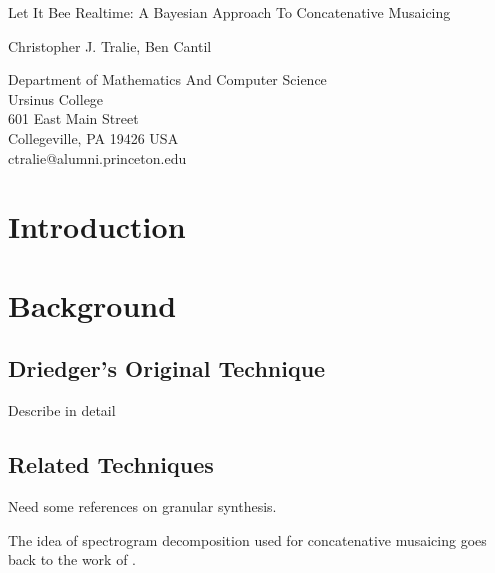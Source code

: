 \documentclass[letterpaper, 12pt]{article}
\begin{document}
{\cmjTitle Let It Bee Realtime: A Bayesian Approach To Concatenative Musaicing}
\vspace*{24pt}


{\cmjAuthor Christopher J. Tralie, Ben Cantil}	%
 
\begin{cmjAuthorAddress}
	Department of Mathematics And Computer Science\\
	Ursinus College\\
	601 East Main Street\\
	Collegeville, PA 19426 USA\\		%
	ctralie@alumni.princeton.edu
\end{cmjAuthorAddress}


\begin{abstract}

\end{abstract}

\section{Introduction}


\section{Background}


\subsection{Driedger's Original Technique}

Describe in detail

\subsection{Related Techniques}

Need some references on granular synthesis.

The idea of spectrogram decomposition used for concatenative musaicing goes back to the work of \cite{burred2013cross}.
\end{document}
